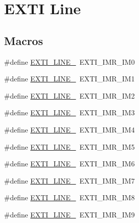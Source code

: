 \hypertarget{group___e_x_t_i___line}{}\section{E\+X\+TI Line}
\label{group___e_x_t_i___line}
\subsection*{Macros}
\begin{DoxyCompactItemize}
\item 
\#define \mbox{\hyperlink{group___e_x_t_i___line_gac1a9cd58d76e9f497abecc832e3294c8}{E\+X\+T\+I\+\_\+\+L\+I\+N\+E\+\_}}~E\+X\+T\+I\+\_\+\+I\+M\+R\+\_\+\+I\+M0
\item 
\#define \mbox{\hyperlink{group___e_x_t_i___line_gaf64b8deca0cf44b4c58d2b4d0fcd2177}{E\+X\+T\+I\+\_\+\+L\+I\+N\+E\+\_}}~E\+X\+T\+I\+\_\+\+I\+M\+R\+\_\+\+I\+M1
\item 
\#define \mbox{\hyperlink{group___e_x_t_i___line_gaec48b88f5279b95962682300c0650840}{E\+X\+T\+I\+\_\+\+L\+I\+N\+E\+\_}}~E\+X\+T\+I\+\_\+\+I\+M\+R\+\_\+\+I\+M2
\item 
\#define \mbox{\hyperlink{group___e_x_t_i___line_ga7e223d61dcb2b538040824c0b491d68c}{E\+X\+T\+I\+\_\+\+L\+I\+N\+E\+\_}}~E\+X\+T\+I\+\_\+\+I\+M\+R\+\_\+\+I\+M3
\item 
\#define \mbox{\hyperlink{group___e_x_t_i___line_gaf8e1e94adf29806583e68170c1dad7dd}{E\+X\+T\+I\+\_\+\+L\+I\+N\+E\+\_}}~E\+X\+T\+I\+\_\+\+I\+M\+R\+\_\+\+I\+M4
\item 
\#define \mbox{\hyperlink{group___e_x_t_i___line_gab7859f0b07e671f71be61d7d301eb909}{E\+X\+T\+I\+\_\+\+L\+I\+N\+E\+\_}}~E\+X\+T\+I\+\_\+\+I\+M\+R\+\_\+\+I\+M5
\item 
\#define \mbox{\hyperlink{group___e_x_t_i___line_gaebcb8302f9aae1d54c7aada7ade230c0}{E\+X\+T\+I\+\_\+\+L\+I\+N\+E\+\_}}~E\+X\+T\+I\+\_\+\+I\+M\+R\+\_\+\+I\+M6
\item 
\#define \mbox{\hyperlink{group___e_x_t_i___line_ga32a33e800bf0f754d0337ab30abde810}{E\+X\+T\+I\+\_\+\+L\+I\+N\+E\+\_}}~E\+X\+T\+I\+\_\+\+I\+M\+R\+\_\+\+I\+M7
\item 
\#define \mbox{\hyperlink{group___e_x_t_i___line_ga0bb9322e3cfbe3a256f9e479ba3e5664}{E\+X\+T\+I\+\_\+\+L\+I\+N\+E\+\_}}~E\+X\+T\+I\+\_\+\+I\+M\+R\+\_\+\+I\+M8
\item 
\#define \mbox{\hyperlink{group___e_x_t_i___line_ga714a1411d5dc8bcf6b6efe69396fbccf}{E\+X\+T\+I\+\_\+\+L\+I\+N\+E\+\_}}~E\+X\+T\+I\+\_\+\+I\+M\+R\+\_\+\+I\+M9

\end{DoxyCompactItemize}
